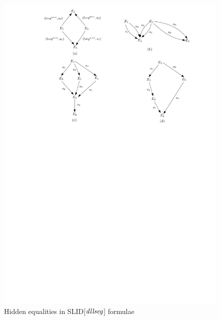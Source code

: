 \documentclass{llncs}
\begin{document}
\begin{figure}[htbp]
\begin{center}
\includegraphics[scale=0.8]{dllseg-equality.pdf}
\end{center}
\vspace{-6mm}
\caption{Hidden equalities in SLID[$\mathit{dllseg}$] formulae}
\label{fig-dllseg-eq}
\vspace{-6mm}
\end{figure}
\end{document}
